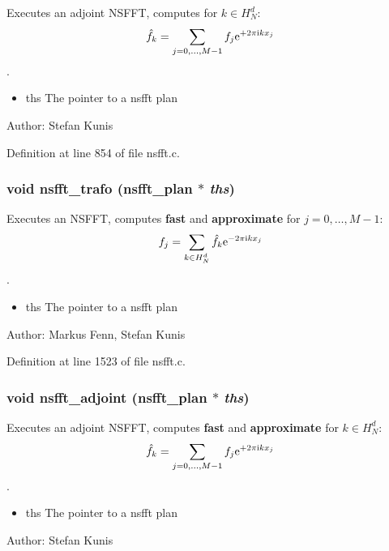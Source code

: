 Executes an adjoint NSFFT, computes for $k\in H_N^d$: \[ \hat f_k = \sum_{j=0,\hdots,M-1} f_j {\rm e}^{+2\pi{\rm\scriptsize i}k x_j} \]. 

\begin{itemize}
\item ths The pointer to a nsfft plan\end{itemize}
\begin{Desc}
\item[Author:]Stefan Kunis \end{Desc}


Definition at line 854 of file nsfft.c.\hypertarget{group__nsfft_gee06e4a864e22e2c41f71606a8e2644e}{
\subsubsection{\setlength{\rightskip}{0pt plus 5cm}void nsfft\_\-trafo ({\bf nsfft\_\-plan} $\ast$ {\em ths})}}
\label{group__nsfft_gee06e4a864e22e2c41f71606a8e2644e}


Executes an NSFFT, computes {\bf fast} and {\bf approximate} for $j=0,\hdots,M-1$: \[ f_j = \sum_{k\in H_N^d}\hat f_k {\rm e}^{-2\pi{\rm\scriptsize i}k x_j} \]. 

\begin{itemize}
\item ths The pointer to a nsfft plan\end{itemize}
\begin{Desc}
\item[Author:]Markus Fenn, Stefan Kunis \end{Desc}


Definition at line 1523 of file nsfft.c.\hypertarget{group__nsfft_gb3de4bceeffaea05a29daf75cad04d38}{
\subsubsection{\setlength{\rightskip}{0pt plus 5cm}void nsfft\_\-adjoint ({\bf nsfft\_\-plan} $\ast$ {\em ths})}}
\label{group__nsfft_gb3de4bceeffaea05a29daf75cad04d38}


Executes an adjoint NSFFT, computes {\bf fast} and {\bf approximate} for $k\in H_N^d$: \[ \hat f_k = \sum_{j=0,\hdots,M-1} f_j {\rm e}^{+2\pi{\rm\scriptsize i}k x_j} \]. 

\begin{itemize}
\item ths The pointer to a nsfft plan\end{itemize}
\begin{Desc}
\item[Author:]Stefan Kunis \end{Desc}


